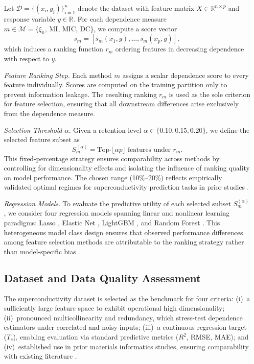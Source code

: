 \documentclass[twoside,11pt]{article}
\begin{document}
Let $\mathcal{D} = \{(x_i, y_i)\}_{i=1}^n$ denote the dataset with feature
matrix $X \in \mathbb{R}^{n \times p}$ and response variable $y \in \mathbb{R}$.
For each dependence measure
$m \in \mathcal{M} = \{\xi_n,\, \mathrm{MI},\, \mathrm{MIC},\, \mathrm{DC}\}$,
we compute a score vector
\[
s_m = [s_m(x_1, y), \dots, s_m(x_p, y)],
\]
which induces a ranking function $r_m$ ordering features in decreasing dependence
with respect to $y$.

\textit{Feature Ranking Step.} Each method $m$ assigns a scalar dependence score to every feature individually.
Scores are computed on the training partition only to prevent information leakage.
The resulting ranking $r_m$ is used as the sole criterion for feature selection,
ensuring that all downstream differences arise exclusively from the dependence
measure.

\textit{Selection Threshold $\alpha$.} Given a retention level $\alpha \in \{0.10, 0.15, 0.20\}$, we define the
selected feature subset as
\[
S_m^{(\alpha)} = \text{Top-}\lfloor \alpha p \rfloor \text{ features under }
r_m.
\]
This fixed-percentage strategy ensures comparability across methods by
controlling for dimensionality effects and isolating the influence of ranking
quality on model performance. The chosen range (10\%--20\%) reflects
empirically validated optimal regimes for superconductivity prediction tasks
in prior studies \citep{Stanev2018machine, Matasov2020vis}.

\textit{Regression Models.} To evaluate the predictive utility of each selected subset $S_m^{(\alpha)}$,
we consider four regression models spanning linear and nonlinear learning
paradigms: Lasso \citep{Tibshirani1996lasso}, Elastic Net
\citep{ZouHastie2005elasticnet}, LightGBM \citep{Ke2017lightgbm}, and Random
Forest \citep{Breiman2001rf}. This heterogeneous model class design ensures that
observed performance differences among feature selection methods are attributable
to the ranking strategy rather than model-specific bias
\citep{Boulesteix2013plea, Munozpreto2022}.

\subsection{Dataset and Data Quality Assessment}
\label{sec:dataset}
The superconductivity dataset \citep{Hamidieh2018data, Matasov2020vis} is
selected as the benchmark for four criteria: (i)~a sufficiently large feature
space to exhibit operational high dimensionality; (ii)~pronounced
multicollinearity and redundancy, which stress-test dependence estimators under
correlated and noisy inputs; (iii)~a continuous regression target ($T_c$),
enabling evaluation via standard predictive metrics ($R^2$, RMSE, MAE); and
(iv)~established use in prior materials informatics studies, ensuring
comparability with existing literature
\citep{Stanev2018machine, Yu2023prediction, Carral2024interpretably}.
\end{document}
